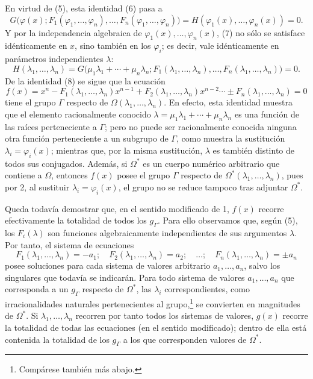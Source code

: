 En virtud de (5), esta identidad (6) pasa a
\begin{equation}\tag{7}
G\bigl(\varphi(x);F_1(\varphi_1,
\ldots,\varphi_n),\ldots,F_n(\varphi_1,
\ldots,\varphi_n)\bigr)
=H(\varphi_1(x),\ldots,\varphi_n(x))=0.
\end{equation}
Y por la independencia algebraica de $\varphi_1(x),\ldots,\varphi_n(x)$, (7) no sólo se satisface idénticamente en $x$, sino también en los $\varphi_i$; es decir, vale idénticamente en parámetros independientes $\lambda$:
\begin{equation}\tag{8}
H(\lambda_1,
\ldots,\lambda_n)=G\bigl(\mu_1\lambda_1+\cdots+\mu_n\lambda_n;
F_1(\lambda_1,
\ldots,\lambda_n),\ldots,F_n(\lambda_1,
\ldots,\lambda_n)\bigr)=0.
\end{equation}
De la identidad (8) se sigue que la ecuación
\begin{equation}\tag{9}
f(x)=x^n-F_1(\lambda_1,
\ldots,\lambda_n)x^{n-1}+F_2(\lambda_1,
\ldots,\lambda_n)x^{n-2}\cdots \pm F_n(\lambda_1,
\ldots,\lambda_n)=0
\end{equation}
tiene el grupo $\Gamma$ respecto de $\Omega(\lambda_1,
\ldots,\lambda_n)$. En efecto, esta identidad muestra que el elemento racionalmente conocido $\lambda=\mu_1\lambda_1+
\cdots+
\mu_n\lambda_n$ es una función de las raíces perteneciente a $\Gamma$; pero no puede ser racionalmente conocida ninguna otra función perteneciente a un subgrupo de $\Gamma$, como muestra la sustitución $\lambda_i=\varphi_i(x)$; mientras que, por la misma sustitución, $\lambda$ es también distinto de todos sus conjugados. Además, si $\Omega^*$ es un cuerpo numérico arbitrario que contiene a $\Omega$, entonces $f(x)$ posee el grupo $\Gamma$ respecto de $\Omega^*(\lambda_1,
\ldots,\lambda_n)$, pues por 2, al sustituir $\lambda_i=\varphi_i(x)$, el grupo no se reduce tampoco tras adjuntar $\Omega^*$.

Queda todavía demostrar que, en el sentido modificado de 1, $f(x)$ recorre efectivamente la totalidad de todos los $g_\Gamma$. Para ello observamos que, según (5), los $F_i(\lambda)$ son funciones algebraicamente independientes de sus argumentos $\lambda$. Por tanto, el sistema de ecuaciones
\begin{equation}\tag{10}
F_1(\lambda_1,
\ldots,\lambda_n)=-a_1;\quad F_2(\lambda_1,
\ldots,\lambda_n)=a_2;\quad\ldots;\quad F_n(\lambda_1,
\ldots,\lambda_n)=\pm a_n
\end{equation}
posee soluciones para cada sistema de valores arbitrario $a_1,
\ldots,a_n$, salvo los singulares que todavía se indicarán. Para todo sistema de valores $a_1,
\ldots,a_n$ que corresponda a un $g_\Gamma$ respecto de $\Omega^*$, las $\lambda_i$ correspondientes, como irracionalidades naturales pertenecientes al grupo,\footnote{Compárese también más abajo.} se convierten en magnitudes de $\Omega^*$. Si $\lambda_1,
\ldots,\lambda_n$ recorren por tanto todos los sistemas de valores, $g(x)$ recorre la totalidad de todas las ecuaciones (en el sentido modificado); dentro de ella está contenida la totalidad de los $g_\Gamma$ a los que corresponden valores de $\Omega^*$.


